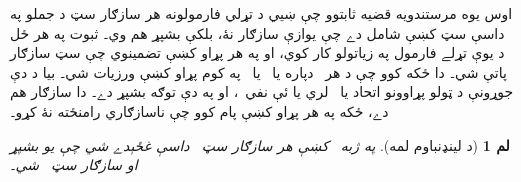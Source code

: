 \documentclass[12pt,a4paper,oneside]{report}
\newcommand{\olfileid}[3]{\gdef\pspart{#1}\gdef\pschapter{#2}\gdef\pssection{#3}}
\gdef\pspart{#2}\gdef\pschapter{#3}\gdef\pssection{}%
\newcommand{\ollabel}[1]{\label{\pspart:\pschapter:\pssection:#1}}
\newtheorem{lem}[thm]{لم}
\theoremstyle{definition}
\newenvironment{explain}{}{}
\begin{document}
\label{olpseg:OLP-0131-B004:start}
\olfileid{fol}{com}{lin}
\label{olpseg:OLP-0131-B004:end}

\label{olpseg:OLP-0131-B005:start}
\label{olpseg:OLP-0131-B005:end}

\label{olpseg:OLP-0131-B006:start}
\begin{explain}
اوس يوه مرستندويه قضيه ثابتوو چې ښيي د تړلي فارمولونه هر سازګار
سټ د جملو په داسې سټ کښې شامل دے چې يوازې سازګار نۀ، بلکې
بشپړ هم وي۔ ثبوت په هر ځل د يوې تړلے فارمول په زياتولو
کار کوي، او په هر پړاو کښې تضمينوي چې سټ سازګار پاتې شي۔ دا ځکه
کوو چې د هر~ دپاره يا~ يا~ په کوم پړاو کښې
ورزيات شي۔ بيا د دې جوړونې د ټولو پړاوونو اتحاد يا~ لري يا
ئې نفي~، او په دې توګه بشپړ دے۔ دا سازګار هم دے، ځکه
په هر پړاو کښې پام کوو چې ناسازګاري رامنځته نۀ کړو۔
\end{explain}
\label{olpseg:OLP-0131-B006:end}

\label{olpseg:OLP-0131-B007:start}
\begin{lem}[د لينډنباوم لمه]
\ollabel{lem:lindenbaum} په ژبه~ کښې هر سازګار
سټ~\LR{$\Gamma$} داسې غځېدے شي چې يو بشپړ او سازګار
سټ~\LR{$\Gamma^*$} شي۔
\end{lem}
\label{olpseg:OLP-0131-B007:end}
\end{document}
